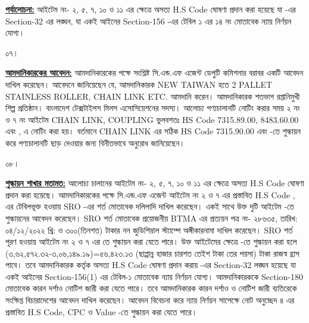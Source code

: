 \documentclass[12pt]{article}
\newcommand{\co}{NEW TAIWAN}
\newcommand{\btmaltno}{প্রত্যয়ন পত্র নং- ২৮৬৩৫}
\newcommand{\btmaltnodt}{তারিখ:  ০৪/১২/২০২২ খ্রি:}
\begin{document}
\begin{minipage}[t]{0.95\linewidth}
\underline{\textbf{পর্যালোচনা:}}
আইটেম নং-  ২, ৫, ৭, ১০ ও ১১ এর ক্ষেত্রে
অসত্য H.S Code ঘোষণা প্রদান করা হয়েছে যা
{\tca}
-এর Section-32 এর লঙ্ঘন, যা একই আইনের
Section-156 -এর টেবিল ১ এর ১৪ নং মোতাবেক ন্যায় নির্ণয়ন যোগ্য।
\\
\end{minipage}
\begin{minipage}[t]{0.05\linewidth}
০৭।
\end{minipage}
\begin{minipage}[t]{0.95\linewidth}
\underline{\textbf{আমদানিকারকের আবেদন:}}
আমদানিকারকের পক্ষে সংশ্লিষ্ট সি.এন্ড.এফ এজেন্ট
ডেপুটি কমিশনার বরাবর একটি আবেদন দাখিল করেছেন।
আবেদনে জানিয়েছেন যে,
আমদানিকারক {\jdwl}
{\co} হতে 2 PALLET STAINLESS ROLLER, CHAIN LINK ETC. আমদানি করেন।
আমদানিকারক শতভাগ রপ্তানিমুখী শিল্প প্রতিষ্ঠান। বাংলাদেশ টেক্সটাইলস মিলস এসোসিয়েশনের সদস্য। আলোচ্য পণ্যচালানটি নোটিং করার সময় ২ নং ও ৭ নং আইটেম CHAIN LINK, COUPLING ভুলবশতঃ HS Code 7315.89.00, 8483.60.00 এবং {\cpcost}, {\cpcttz} এ নোটিং করা হয়।
বর্তমানে CHAIN LINK এর সঠিক HS Code 7315.90.00
এবং {\cpcofs} -তে শুল্কায়ন করে পণ্যচালানটি ছাড় দেওয়ার জন্য বিনীতভাবে অনুরোধ জানিয়েছেন।
\\
\end{minipage}
\begin{minipage}[t]{0.05\linewidth}
০৮।
\end{minipage}
\begin{minipage}[t]{0.95\linewidth}
\underline{\textbf{শুল্কায়ন শাখার মতামত:}}
আলোচ্য চালানের আইটেম নং-
২, ৫, ৭, ১০ ও ১১
এর ক্ষেত্রে অসত্য H.S Code ঘোষণা প্রদান করা হয়েছে।
আমদানিকারকের পক্ষে সি.এন্ড.এফ এজেন্ট আইটেম নং
২ ও ৭ এর প্রস্তাবিত H.S Code
{\srootz}, {\srootzd}
এর টেবিলভূক্ত হওয়ায় SRO -এর শর্ত মোতাবেক দলিলাদি
দাখিল করেছেন। একই সাথে উক্ত দুটি আইটেম
{\cpcofs} -তে শুল্কায়নের আবেদন করেছেন।
SRO শর্ত মোতাবেক প্রয়োজনীয় BTMA এর
{\btmaltno}, {\btmaltnodt}
ও ৩০০(তিনশত) টাকার নন জুডিশিয়াল স্ট্যাম্পে
অঙ্গীকারনামা দাখিল করেছেন। SRO শর্ত পূরণ হওয়ায়
আইটেম নং ২ ও ৭ এর
{\cpcofs} তে
শুল্কায়ন করা যেতে পারে।
উক্ত আইটেমের ক্ষেত্রে
{\cpcofs} -তে শুল্কায়ন করা হলে
(৩,৬২,৫৭২.৩২-৩,০৬,১৪৯.১৯)=৫৬,৪২৩.১৩ (ছাপ্পান্ন হাজার চারশত তেইশ টাকা তের পয়সা) টাকা রাজস্ব হ্রাস পাবে।
তবে আমদানিকারক কর্তৃক অসত্য
H.S Code ঘোষণা প্রদান করায় {\tca} -এর Section-32
লঙ্ঘন হয়েছে যা একই আইনের Section-156(1) এর টেবিল-১
মোতাবেক ন্যায় নির্ণয়ন যোগ্য।
আমদানিকারককে Section-180 মোতাবেক কারন দর্শাও
নোটিশ জারী করা যেতে পারে।
তবে আমদানিকারক কারন দর্শাও
ও নোটিশ জারী ব্যতিরেকে সংক্ষিপ্ত বিচারাদেশের
আবেদন দাখিল করেছেন। আবেদন বিবেচনা করে ন্যায়
নির্ণয়ন সাপেক্ষে নোট অনুচ্ছেদ ৪ এর প্রস্তাবিত
H.S Code, CPC ও Value -তে শুল্কায়ন করা যেতে পারে।
\\
\end{minipage}
\end{document}
